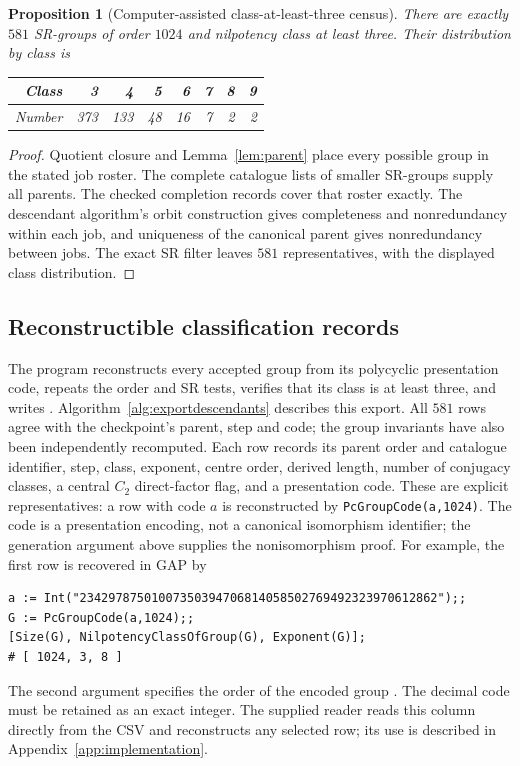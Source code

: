 \documentclass[11pt,a4paper]{amsart}
\newtheorem{prop}[thm]{Proposition}
\theoremstyle{definition}
\theoremstyle{remark}
\numberwithin{equation}{section}
\begin{document}
\begin{prop}[Computer-assisted class-at-least-three census]
\label{prop:census1024}
There are exactly $581$ SR-groups of order $1024$ and nilpotency
class at least three. Their distribution by class is
\begin{center}
\begin{tabular}{@{}r*{7}{r}@{}}\toprule
Class&3&4&5&6&7&8&9\\\midrule
Number&373&133&48&16&7&2&2\\\bottomrule
\end{tabular}
\end{center}
\end{prop}
\begin{proof}
Quotient closure and Lemma~\ref{lem:parent} place every possible
group in the stated job roster. The complete catalogue lists of
smaller SR-groups supply all parents. The checked completion
records cover that roster exactly. The descendant algorithm's
orbit construction gives completeness and nonredundancy within
each job, and uniqueness of the canonical parent gives
nonredundancy between jobs. The exact SR filter leaves $581$
representatives, with the displayed class distribution.
\end{proof}

\subsection{Reconstructible classification records}
The program  reconstructs every accepted group
from its polycyclic presentation code, repeats the order and SR
tests, verifies that its class is at least three, and writes
.
Algorithm~\ref{alg:exportdescendants} describes this export.
All $581$ rows agree with the checkpoint's parent, step and code;
the group invariants have also been independently recomputed.
Each row records its parent order and catalogue identifier, step,
class, exponent, centre order, derived length, number of conjugacy
classes, a central $C_2$ direct-factor flag, and a presentation
code. These are explicit representatives: a row with code $a$
is reconstructed by \texttt{PcGroupCode(a,1024)}.
The code is a presentation encoding, not a canonical isomorphism
identifier; the generation argument above supplies the
nonisomorphism proof.
For example, the first row is recovered in GAP by
\begin{lstlisting}
a := Int("23429787501007350394706814058502769492323970612862");;
G := PcGroupCode(a,1024);;
[Size(G), NilpotencyClassOfGroup(G), Exponent(G)];
# [ 1024, 3, 8 ]
\end{lstlisting}
The second argument specifies the order of the encoded group
\cite[Section~46.9]{GAP}. The decimal code must be retained as an exact
integer. The supplied reader  reads
this column directly from the CSV and reconstructs any selected row;
its use is described in Appendix~\ref{app:implementation}.
\end{document}
